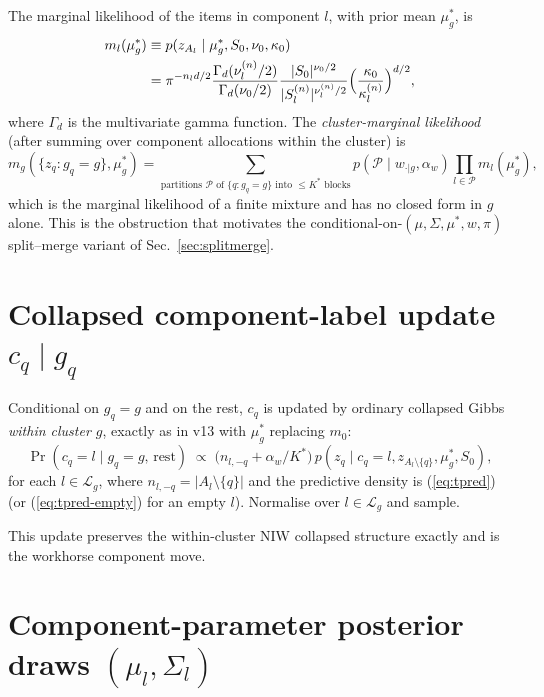 \documentclass[11pt]{article}
\begin{document}
The marginal likelihood of the items in component $l$, with prior mean
$\mu_g^*$, is
\begin{equation}
\begin{aligned}
m_l(\mu_g^*) &\equiv p(z_{A_l}\mid \mu_g^*,S_0,\nu_0,\kappa_0)\\
 &= \pi^{-n_l d/2}
    \frac{\Gamma_d(\nu_l^{(n)}/2)}{\Gamma_d(\nu_0/2)}
    \frac{|S_0|^{\nu_0/2}}{|S_l^{(n)}|^{\nu_l^{(n)}/2}}
    \Bigl(\frac{\kappa_0}{\kappa_l^{(n)}}\Bigr)^{d/2},
\end{aligned}
\label{eq:marg-l}
\end{equation}
where $\Gamma_d$ is the multivariate gamma function. The
\emph{cluster-marginal likelihood} (after summing over component
allocations within the cluster) is
\begin{equation}
m_g(\{z_q:g_q=g\},\mu_g^*) =
   \sum_{\text{partitions }\mathcal{P}\text{ of }\{q:g_q=g\}\text{ into }\le K^*\text{ blocks}}
   p(\mathcal{P}\mid w_{\cdot|g},\alpha_w)\prod_{l\in\mathcal{P}} m_l(\mu_g^*),
\label{eq:marg-g}
\end{equation}
which is the marginal likelihood of a finite mixture and has no closed
form in $g$ alone. This is the obstruction that motivates the
conditional-on-$(\mu,\Sigma,\mu^*,w,\pi)$ split--merge variant of
Sec.~\ref{sec:splitmerge}.

\section{Collapsed component-label update $c_q\mid g_q$}
\label{sec:cupdate}

Conditional on $g_q=g$ and on the rest, $c_q$ is updated by ordinary
collapsed Gibbs \emph{within cluster $g$}, exactly as in v13 with
$\mu_g^*$ replacing $m_0$:
\begin{equation}
\Pr(c_q=l \mid g_q=g,\,\mathrm{rest})
\;\propto\;
\bigl(n_{l,-q} + \alpha_w/K^*\bigr)\,
p(z_q\mid c_q=l,z_{A_l\setminus\{q\}},\mu_g^*,S_0),
\label{eq:cupdate}
\end{equation}
for each $l\in\mathcal{L}_g$, where $n_{l,-q}=|A_l\setminus\{q\}|$ and
the predictive density is (\ref{eq:tpred}) (or (\ref{eq:tpred-empty})
for an empty $l$). Normalise over $l\in\mathcal{L}_g$ and sample.

This update preserves the within-cluster NIW collapsed structure exactly
and is the workhorse component move.

\section{Component-parameter posterior draws $(\mu_l,\Sigma_l)$}
\label{sec:musig-update}
\end{document}
